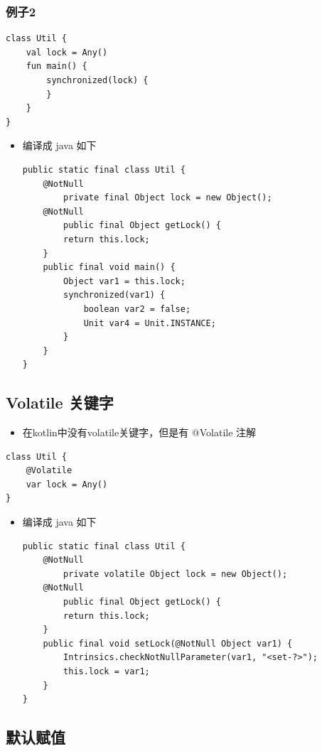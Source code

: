 \documentclass[9pt, b5paper]{article}
\begin{document}
\subsubsection{例子2}
\label{sec-6-2-2}
\begin{verbatim}
class Util {
    val lock = Any()
    fun main() {
        synchronized(lock) {
        }
    }
}
\end{verbatim}
\begin{itemize}
\item 编译成 java 如下
\begin{verbatim}
public static final class Util {
    @NotNull
        private final Object lock = new Object();
    @NotNull
        public final Object getLock() {
        return this.lock;
    }
    public final void main() {
        Object var1 = this.lock;
        synchronized(var1) {
            boolean var2 = false;
            Unit var4 = Unit.INSTANCE;
        }
    }
}
\end{verbatim}
\end{itemize}
\subsection{Volatile 关键字}
\label{sec-6-3}
\begin{itemize}
\item 在kotlin中没有volatile关键字，但是有 @Volatile 注解
\end{itemize}
\begin{verbatim}
class Util {
    @Volatile
    var lock = Any()
}
\end{verbatim}
\begin{itemize}
\item 编译成 java 如下
\begin{verbatim}
public static final class Util {
    @NotNull
        private volatile Object lock = new Object();
    @NotNull
        public final Object getLock() {
        return this.lock;
    }
    public final void setLock(@NotNull Object var1) {
        Intrinsics.checkNotNullParameter(var1, "<set-?>");
        this.lock = var1;
    }
}
\end{verbatim}
\end{itemize}

\subsection{默认赋值}
\label{sec-6-4}
\end{document}
